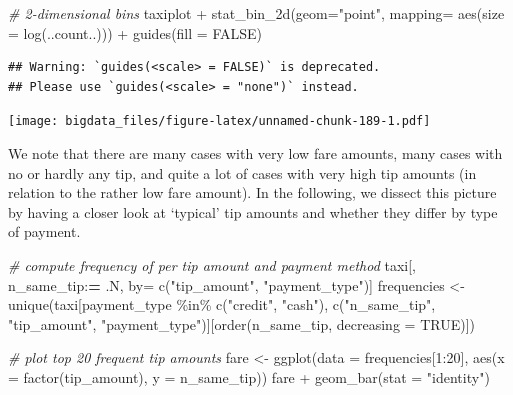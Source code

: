\documentclass[
  12pt,
]{style/krantz}
\newenvironment{Shaded}{\begin{snugshade}}{\end{snugshade}}
\newcommand{\AttributeTok}[1]{\textcolor[rgb]{0.77,0.63,0.00}{#1}}
\newcommand{\CommentTok}[1]{\textcolor[rgb]{0.56,0.35,0.01}{\textit{#1}}}
\newcommand{\ConstantTok}[1]{\textcolor[rgb]{0.00,0.00,0.00}{#1}}
\newcommand{\DecValTok}[1]{\textcolor[rgb]{0.00,0.00,0.81}{#1}}
\newcommand{\ErrorTok}[1]{\textcolor[rgb]{0.64,0.00,0.00}{\textbf{#1}}}
\newcommand{\FunctionTok}[1]{\textcolor[rgb]{0.00,0.00,0.00}{#1}}
\newcommand{\NormalTok}[1]{#1}
\newcommand{\OtherTok}[1]{\textcolor[rgb]{0.56,0.35,0.01}{#1}}
\newcommand{\SpecialCharTok}[1]{\textcolor[rgb]{0.00,0.00,0.00}{#1}}
\newcommand{\StringTok}[1]{\textcolor[rgb]{0.31,0.60,0.02}{#1}}
\begin{document}
\begin{Shaded}
\begin{Highlighting}[]
\CommentTok{\# 2{-}dimensional bins}
\NormalTok{taxiplot }\SpecialCharTok{+}
     \FunctionTok{stat\_bin\_2d}\NormalTok{(}\AttributeTok{geom=}\StringTok{"point"}\NormalTok{,}
                 \AttributeTok{mapping=} \FunctionTok{aes}\NormalTok{(}\AttributeTok{size =} \FunctionTok{log}\NormalTok{(..count..))) }\SpecialCharTok{+}
     \FunctionTok{guides}\NormalTok{(}\AttributeTok{fill =} \ConstantTok{FALSE}\NormalTok{)}
\end{Highlighting}
\end{Shaded}

\begin{verbatim}
## Warning: `guides(<scale> = FALSE)` is deprecated.
## Please use `guides(<scale> = "none")` instead.
\end{verbatim}

\texttt{[image: bigdata\_files/figure-latex/unnamed-chunk-189-1.pdf]}

We note that there are many cases with very low fare amounts, many cases with no or hardly any tip, and quite a lot of cases with very high tip amounts (in relation to the rather low fare amount). In the following, we dissect this picture by having a closer look at `typical' tip amounts and whether they differ by type of payment.

\begin{Shaded}
\begin{Highlighting}[]
\CommentTok{\# compute frequency of per tip amount and payment method}
\NormalTok{taxi[, n\_same\_tip}\SpecialCharTok{:}\ErrorTok{=}\NormalTok{ .N, by}\OtherTok{=} \FunctionTok{c}\NormalTok{(}\StringTok{"tip\_amount"}\NormalTok{, }\StringTok{"payment\_type"}\NormalTok{)]}
\NormalTok{frequencies }\OtherTok{\textless{}{-}} \FunctionTok{unique}\NormalTok{(taxi[payment\_type }\SpecialCharTok{\%in\%} \FunctionTok{c}\NormalTok{(}\StringTok{"credit"}\NormalTok{, }\StringTok{"cash"}\NormalTok{),}
                           \FunctionTok{c}\NormalTok{(}\StringTok{"n\_same\_tip"}\NormalTok{, }\StringTok{"tip\_amount"}\NormalTok{, }\StringTok{"payment\_type"}\NormalTok{)][}\FunctionTok{order}\NormalTok{(n\_same\_tip, }\AttributeTok{decreasing =} \ConstantTok{TRUE}\NormalTok{)])}


\CommentTok{\# plot top 20 frequent tip amounts}
\NormalTok{fare }\OtherTok{\textless{}{-}} \FunctionTok{ggplot}\NormalTok{(}\AttributeTok{data =}\NormalTok{ frequencies[}\DecValTok{1}\SpecialCharTok{:}\DecValTok{20}\NormalTok{], }\FunctionTok{aes}\NormalTok{(}\AttributeTok{x =} \FunctionTok{factor}\NormalTok{(tip\_amount), }\AttributeTok{y =}\NormalTok{ n\_same\_tip)) }
\NormalTok{fare }\SpecialCharTok{+} \FunctionTok{geom\_bar}\NormalTok{(}\AttributeTok{stat =} \StringTok{"identity"}\NormalTok{) }
\end{Highlighting}
\end{Shaded}
\end{document}
